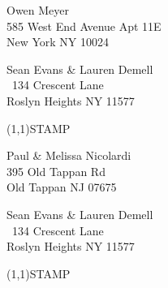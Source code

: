\documentclass[12pt]{article}
\begin{document}
\begin{center} \begin{Huge} \vspace*{\fill}
Owen Meyer\\
585 West End Avenue Apt 11E\\
New York NY 10024\\
\vspace{\fill} \end{Huge} \end{center}

\clearpage

\begin{minipage}{.5\linewidth} \noindent
Sean Evans \& Lauren Demell\\\ 
134 Crescent Lane\\ 
Roslyn Heights NY 11577
\end{minipage}
\begin{minipage}{.5\linewidth \hspace{-.2in} \vspace{-.3in}}
\begin{flushright}
\framebox(1,1){STAMP}
\end{flushright}
\end{minipage}

\begin{center} \begin{Huge} \vspace*{\fill}
Paul \& Melissa Nicolardi\\
395 Old Tappan Rd\\
Old Tappan NJ 07675\\
\vspace{\fill} \end{Huge} \end{center}

\clearpage

\begin{minipage}{.5\linewidth} \noindent
Sean Evans \& Lauren Demell\\\ 
134 Crescent Lane\\ 
Roslyn Heights NY 11577
\end{minipage}
\begin{minipage}{.5\linewidth \hspace{-.2in} \vspace{-.3in}}
\begin{flushright}
\framebox(1,1){STAMP}
\end{flushright}
\end{minipage}
\end{document}
